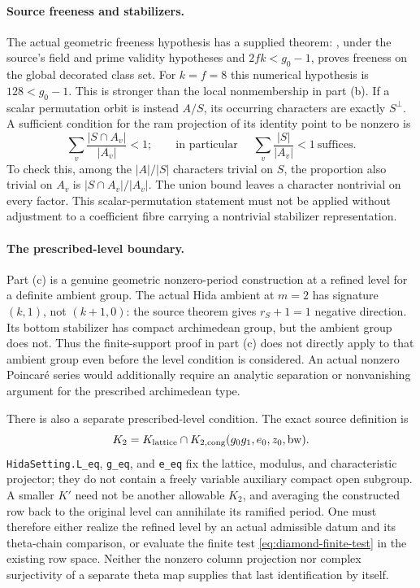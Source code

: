 \documentclass[11pt,a4paper]{article}
\theoremstyle{definition}
\theoremstyle{remark}
\begin{document}
\paragraph{Source freeness and stabilizers.}
The actual geometric freeness hypothesis has a supplied theorem:
, under
the source's field and prime validity hypotheses and
$2fk<g_0-1$, proves freeness on the global decorated class set.
For $k=f=8$ this numerical hypothesis is $128<g_0-1$.
This is stronger than the local nonmembership in part (b).
If a scalar permutation orbit is instead $A/S$, its occurring
characters are exactly $S^\perp$.  A sufficient condition for the
ram projection of its identity point to be nonzero is
\[
 \sum_v\frac{|S\cap A_v|}{|A_v|}<1;
 \qquad\text{in particular }\quad
 \sum_v\frac{|S|}{|A_v|}<1\ \text{suffices}.
\]
To check this, among the $|A|/|S|$ characters trivial on $S$, the
proportion also trivial on $A_v$ is
$|S\cap A_v|/|A_v|$.  The union bound leaves a character nontrivial
on every factor.  This scalar-permutation statement must not be
applied without adjustment to a coefficient fibre carrying a
nontrivial stabilizer representation.

\paragraph{The prescribed-level boundary.}
Part (c) is a genuine geometric nonzero-period construction at a
refined level for a definite ambient group.  The actual Hida ambient
at $m=2$ has signature $(k,1)$, not $(k+1,0)$: the source theorem
 gives $r_S+1=1$ negative
direction.  Its bottom stabilizer has compact archimedean group,
but the ambient group does not.  Thus the finite-support proof in
part (c) does not directly apply to that ambient group even before
the level condition is considered.  An actual nonzero Poincar\'e
series would additionally require an analytic separation or
nonvanishing argument for the prescribed archimedean type.

There is also a separate prescribed-level condition.  The exact
source definition is
\[
 K_2=K_{\rm lattice}\cap
 K_{2,\mathrm{cong}}(g_0g_1,e_0,z_0,\mathrm{bw}).
\]
\texttt{HidaSetting.L\_eq}, \texttt{g\_eq}, and
\texttt{e\_eq} fix the lattice, modulus, and characteristic
projector; they do not contain a freely variable auxiliary compact
open subgroup.  A smaller $K'$ need not be another allowable $K_2$,
and averaging the constructed row back to the original level can
annihilate its ramified period.  One must therefore either realize
the refined level by an actual admissible datum and its theta-chain
comparison, or evaluate the finite test
\eqref{eq:diamond-finite-test} in the existing row space.  Neither
the nonzero column projection nor complex surjectivity of a separate
theta map supplies that last identification by itself.
\end{document}

